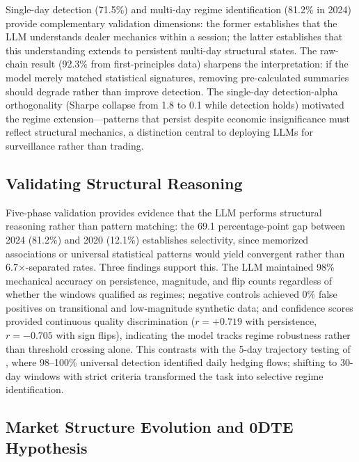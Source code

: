 \documentclass[jrfm,article,accept,moreauthors,pdftex]{Definitions/mdpi}
\begin{document}
Single-day detection (71.5\%) and multi-day regime identification (81.2\% in 2024) provide complementary validation dimensions: the former establishes that the LLM understands dealer mechanics within a session; the latter establishes that this understanding extends to persistent multi-day structural states. The raw-chain result (92.3\% from first-principles data) sharpens the interpretation: if the model merely matched statistical signatures, removing pre-calculated summaries should degrade rather than improve detection. The single-day detection-alpha orthogonality (Sharpe collapse from 1.8 to 0.1 while detection holds) motivated the regime extension---patterns that persist despite economic insignificance must reflect structural mechanics, a distinction central to deploying LLMs for surveillance rather than trading.

\subsection{Validating Structural Reasoning}

Five-phase validation provides evidence that the LLM performs structural reasoning rather than pattern matching: the 69.1 percentage-point gap between 2024 (81.2\%) and 2020 (12.1\%) establishes selectivity, since memorized associations or universal statistical patterns would yield convergent rather than 6.7$\times$-separated rates. Three findings support this. The LLM maintained 98\% mechanical accuracy on persistence, magnitude, and flip counts regardless of whether the windows qualified as regimes; negative controls achieved 0\% false positives on transitional and low-magnitude synthetic data; and confidence scores provided continuous quality discrimination ($r = +0.719$ with persistence, $r = -0.705$ with sign flips), indicating the model tracks regime robustness rather than threshold crossing alone. This contrasts with the 5-day trajectory testing of \citep{regan2025obfuscation}, where 98--100\% universal detection identified daily hedging flows; shifting to 30-day windows with strict criteria transformed the task into selective regime identification.

\subsection{Market Structure Evolution and 0DTE Hypothesis}
\label{sec:discussion:0dte}
\end{document}
